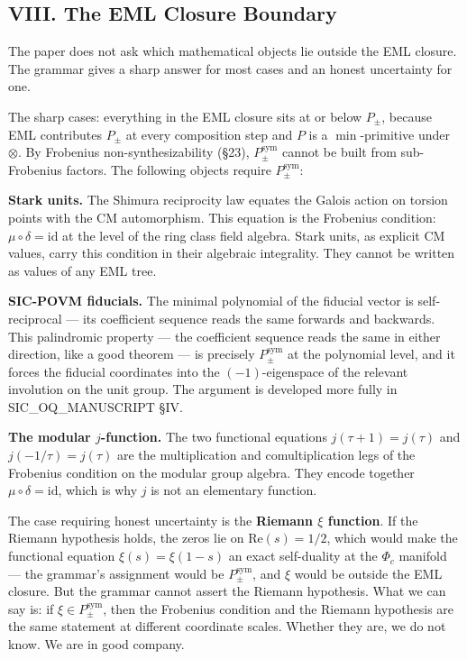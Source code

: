 \documentclass[12pt,a4paper]{article}
\newcommand{\pilcrow}{\S}
\begin{document}
\subsection{VIII. The EML Closure Boundary}

The paper does not ask which mathematical objects lie outside the EML closure.
The grammar gives a sharp answer for most cases and an honest uncertainty for one.

The sharp cases: everything in the EML closure sits at or below $P_{\pm}$, because
EML contributes $P_{\pm}$ at every composition step and $P$ is a $\min$-primitive
under $\otimes$. By Frobenius non-synthesizability (\pilcrow{}23), $P_{\pm}^{\text{sym}}$
cannot be built from sub-Frobenius factors. The following objects require
$P_{\pm}^{\text{sym}}$:

\textbf{Stark units.} The Shimura reciprocity law equates the Galois action on torsion
points with the CM automorphism. This equation is the Frobenius condition:
$\mu \circ \delta = \text{id}$ at the level of the ring class field algebra. Stark
units, as explicit CM values, carry this condition in their algebraic integrality.
They cannot be written as values of any EML tree.

\textbf{SIC-POVM fiducials.} The minimal polynomial of the fiducial vector is
self-reciprocal --- its coefficient sequence reads the same forwards and backwards.
This palindromic property --- the coefficient sequence reads the same in either
direction, like a good theorem --- is precisely $P_{\pm}^{\text{sym}}$ at the polynomial
level, and it forces the fiducial coordinates into the $(-1)$-eigenspace of the
relevant involution on the unit group. The argument is developed more fully in
SIC\_OQ\_MANUSCRIPT \pilcrow{}IV.

\textbf{The modular $j$-function.} The two functional equations $j(\tau+1) = j(\tau)$
and $j(-1/\tau) = j(\tau)$ are the multiplication and comultiplication legs of
the Frobenius condition on the modular group algebra. They encode together
$\mu \circ \delta = \text{id}$, which is why $j$ is not an elementary function.

The case requiring honest uncertainty is the \textbf{Riemann $\xi$ function}. If the
Riemann hypothesis holds, the zeros lie on $\text{Re}(s) = 1/2$, which would
make the functional equation $\xi(s) = \xi(1-s)$ an exact self-duality at the
$\Phi_c$ manifold --- the grammar's assignment would be $P_{\pm}^{\text{sym}}$, and
$\xi$ would be outside the EML closure. But the grammar cannot assert the Riemann
hypothesis. What we can say is: if $\xi \in P_{\pm}^{\text{sym}}$, then the
Frobenius condition and the Riemann hypothesis are the same statement at different
coordinate scales. Whether they are, we do not know. We are in good company.
\end{document}
